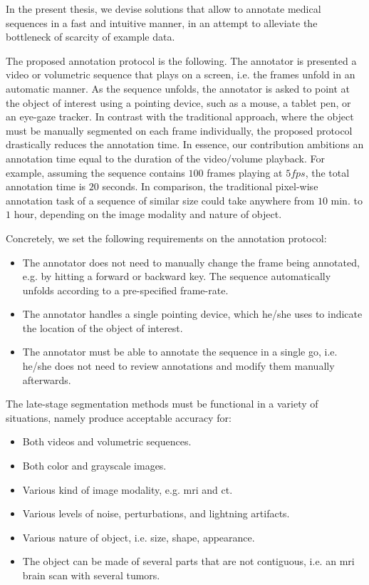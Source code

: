 In the present thesis, we devise solutions that allow to annotate medical sequences in a fast and intuitive manner, in an attempt to alleviate the bottleneck of scarcity of example data.

The proposed annotation protocol is the following.
The annotator is presented a video or volumetric sequence that plays on a screen, i.e. the frames unfold in an automatic manner.
As the sequence unfolds, the annotator is asked to point at the object of interest using a pointing device, such as a mouse, a tablet pen, or an eye-gaze tracker.
In contrast with the traditional approach, where the object must be manually segmented on each frame individually, the proposed protocol drastically reduces the annotation time.
In essence, our contribution ambitions an annotation time equal to the duration of the video/volume playback.
For example, assuming the sequence contains $100$ frames playing at $5fps$, the total annotation time is $20$ seconds.
In comparison, the traditional pixel-wise annotation task of a sequence of similar size could take anywhere from $10$ min. to $1$ hour, depending on the image modality and nature of object.

Concretely, we set the following requirements on the annotation protocol:
\begin{itemize}
  \item The annotator does not need to manually change the frame being annotated, e.g. by hitting a forward or backward key. The sequence automatically unfolds according to a pre-specified frame-rate.
  \item The annotator handles a single pointing device, which he/she uses to indicate the location of the object of interest.
  \item The annotator must be able to annotate the sequence in a single go, i.e. he/she does not need to review annotations and modify them manually afterwards.
\end{itemize}

The late-stage segmentation methods must be functional in a variety of situations, namely produce acceptable accuracy for:
\begin{itemize}
  \item Both videos and volumetric sequences.
  \item Both color and grayscale images.
  \item Various kind of image modality, e.g. \gls{mri} and \gls{ct}.
  \item Various levels of noise, perturbations, and lightning artifacts.
  \item Various nature of object, i.e. size, shape, appearance.
  \item The object can be made of several parts that are not contiguous, i.e. an \gls{mri} brain scan with several tumors.
\end{itemize}


